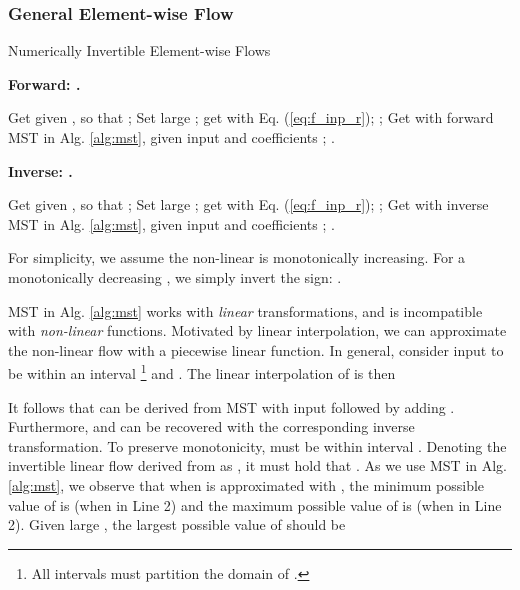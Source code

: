 \documentclass{article}
\begin{document}
\subsubsection{General Element-wise Flow}

\begin{algorithm}[h]
\small
\caption{Numerically Invertible Element-wise Flows}
\begin{multicols}{2} 
\textbf{Forward: .} 

\begin{algorithmic}[1]
\STATE Get  given , so that ;
\STATE Set large ; get  with Eq. (\ref{eq:f_inp_r}); ;
\STATE Get  with forward MST in Alg. \ref{alg:mst}, given input  and coefficients ;
\RETURN . 
\end{algorithmic}

\textbf{Inverse: .} 

\begin{algorithmic}[1]
\STATE Get  given , so that ;
\STATE Set large ; get  with Eq. (\ref{eq:f_inp_r}); ;
\STATE Get  with inverse MST in Alg. \ref{alg:mst}, given input  and coefficients ;
\RETURN . 
\end{algorithmic}
\end{multicols}
\vspace{-8pt}
\label{alg:ni_eleflow}
\end{algorithm}



For simplicity, we assume the non-linear  is monotonically increasing. For a monotonically decreasing , we simply invert the sign: .

MST in Alg. \ref{alg:mst} works with \textit{linear} transformations, and is incompatible with \textit{non-linear} functions. Motivated by linear interpolation, we can approximate the non-linear flow  with a piecewise linear function. In general, consider input  to be within an interval \footnote{All intervals must 
partition the domain of .} and . The linear interpolation of  is then

It follows that  can be derived from MST with input  followed by adding . Furthermore,  and  can be recovered with the corresponding inverse transformation.
To preserve monotonicity,  must be within interval . Denoting the invertible linear flow derived from  as , it must hold that . As we use MST in Alg. \ref{alg:mst}, we observe that when  is approximated with , the minimum possible value of  is  (when  in Line 2) and the maximum possible value of  is  (when  in Line 2). Given large , the largest possible value of  should be
\end{document}
